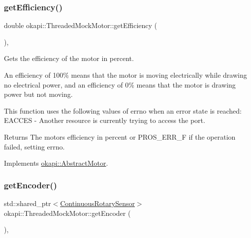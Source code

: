 \subsubsection{\texorpdfstring{getEfficiency()}{getEfficiency()}}
{\footnotesize\ttfamily double okapi\+::\+Threaded\+Mock\+Motor\+::get\+Efficiency (\begin{DoxyParamCaption}{ }\end{DoxyParamCaption})\hspace{0.3cm}{\ttfamily [override]}, {\ttfamily [virtual]}}



Gets the efficiency of the motor in percent. 

An efficiency of 100\% means that the motor is moving electrically while drawing no electrical power, and an efficiency of 0\% means that the motor is drawing power but not moving.

This function uses the following values of errno when an error state is reached\+: E\+A\+C\+C\+ES -\/ Another resource is currently trying to access the port.

\begin{DoxyReturn}{Returns}
The motor\textquotesingle{}s efficiency in percent or P\+R\+O\+S\+\_\+\+E\+R\+R\+\_\+F if the operation failed, setting errno. 
\end{DoxyReturn}


Implements \mbox{\hyperlink{classokapi_1_1AbstractMotor_a27a6e3ec007619a9b91f9d6ebc61e613}{okapi\+::\+Abstract\+Motor}}.

\mbox{\label{classokapi_1_1ThreadedMockMotor_ab070e6847c72ae1aef4e225bbfa65b87}} 
\subsubsection{\texorpdfstring{getEncoder()}{getEncoder()}}
{\footnotesize\ttfamily std\+::shared\+\_\+ptr$<$\mbox{\hyperlink{classokapi_1_1ContinuousRotarySensor}{Continuous\+Rotary\+Sensor}}$>$ okapi\+::\+Threaded\+Mock\+Motor\+::get\+Encoder (\begin{DoxyParamCaption}{ }\end{DoxyParamCaption})\hspace{0.3cm}{\ttfamily [override]}, {\ttfamily [virtual]}}



